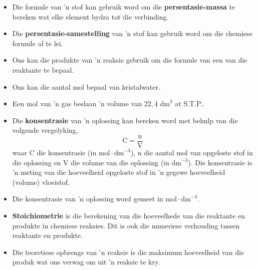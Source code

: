\begin{itemize}[noitemsep]
\item Die formule van 'n stof kan gebruik word om die \textbf{persentasie-massa} te bereken wat elke element bydra tot die verbinding.
\item Die \textbf{persentasie-samestelling} van 'n stof kan gebruik word om die chemiese formule af te lei.
\item Ons kan die produkte van 'n reaksie gebruik om die formule van een van die reaktante te bepaal.
\item Ons kan die aantal mol bepaal van kristalwater.
\item Een mol van 'n gas beslaan 'n volume van $22,4 {\text{ dm}}^{3}$ at S.T.P..
\item Die \textbf{konsentrasie} van 'n oplossing kan bereken word met behulp van die volgende vergelyking,
\label{m38712*id286019}\nopagebreak\noindent{}
    \begin{equation*}
    \text{C}=\frac{\text{n}}{\text{V}}
      \end{equation*}
waar C die konsentrasie (in $\text{mol} \cdot {\text{dm}}^{-3}$), n die aantal mol van opgeloste stof in die oplossing en V die volume van die oplossing (in ${\text{dm}}^{-3}$). Die konsentrasie is 'n meting van die hoeveelheid opgeloste stof in 'n gegewe hoeveelheid (volume) vloeistof.
\item Die konsentrasie van 'n oplossing word gemeet in $\text{mol} \cdot {\text{dm}}^{-3}$.
\item \textbf{Stoichiometrie} is die berekening van die hoeveelhede van die reaktante en produkte in  chemiese reaksies. Dit is ook die numeriese verhouding tussen reaktante en produkte.
\item Die teoretiese opbrengs van 'n reaksie is die maksimum hoeveelheid van die produk wat ons verwag om uit 'n reaksie te kry.\end{itemize}
\label{m38712*secfhsst!!!underscore!!!id2334}
